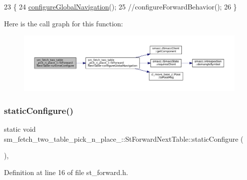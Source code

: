 \begin{DoxyCode}
23     \{
24       \hyperlink{structsm__fetch__two__table__pick__n__place__1_1_1StForwardNextTable_a7b7d04ab57af4686b394afda86c891af}{configureGlobalNavigation}();
25       \textcolor{comment}{//configureForwardBehavior();}
26     \}
\end{DoxyCode}
Here is the call graph for this function\+:
\nopagebreak
\begin{figure}[H]
\begin{center}
\leavevmode
\includegraphics[width=350pt]{structsm__fetch__two__table__pick__n__place__1_1_1StForwardNextTable_a06a2121565cde48bb62e3037c17418a7_cgraph}
\end{center}
\end{figure}
\mbox{\label{structsm__fetch__two__table__pick__n__place__1_1_1StForwardNextTable_a73fcf4091decc1ba1129a547a50f6ff3}} 
\subsubsection{\texorpdfstring{static\+Configure()}{staticConfigure()}}
{\footnotesize\ttfamily static void sm\+\_\+fetch\+\_\+two\+\_\+table\+\_\+pick\+\_\+n\+\_\+place\+\_\+::\+St\+Forward\+Next\+Table\+::static\+Configure (\begin{DoxyParamCaption}{ }\end{DoxyParamCaption})\hspace{0.3cm}{\ttfamily [inline]}, {\ttfamily [static]}}



Definition at line 16 of file st\+\_\+forward.\+h.


